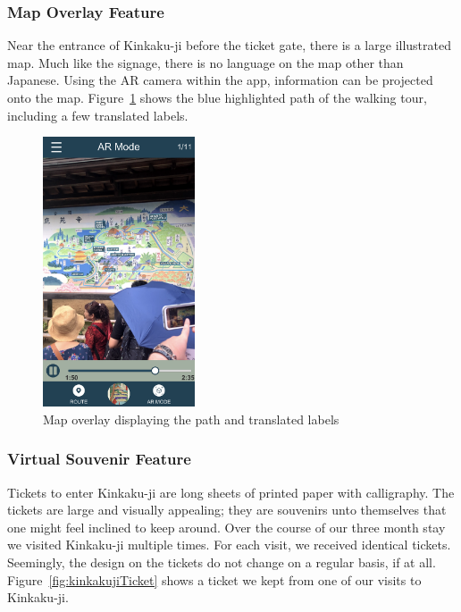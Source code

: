 \documentclass[a4paper, 10pt, american, titlepage]{article}
\begin{document}
\subsubsection{Map Overlay Feature}
\label{sec:mapOverlayFeature}

Near the entrance of Kinkaku-ji before the ticket gate, there is a large
illustrated map. Much like the signage, there is no language on the map other
than Japanese. Using the AR camera within the app, information can be projected
onto the map. Figure~\ref{fig:arMapFeature} shows the blue highlighted path of
the walking tour, including a few translated labels.

\begin{figure}[h] \centering
    \includegraphics[width=0.4\textwidth]{ar-map-feature.png}
    \caption{Map overlay displaying the path and translated labels}
    \label{fig:arMapFeature}
\end{figure}

\subsubsection{Virtual Souvenir Feature}
\label{sec:virtualSouveneir}

Tickets to enter Kinkaku-ji are long sheets of printed paper with calligraphy.
The tickets are large and visually appealing; they are souvenirs unto themselves
that one might feel inclined to keep around. Over the course of our three month
stay we visited Kinkaku-ji multiple times. For each visit, we received identical
tickets. Seemingly, the design on the tickets do not change on a regular basis,
if at all. Figure~\ref{fig:kinkakujiTicket} shows a ticket we kept from one of
our visits to Kinkaku-ji.
\end{document}
